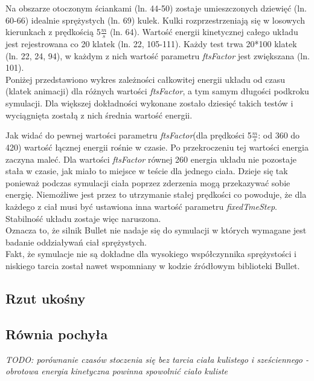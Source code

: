 
  
Na obszarze otoczonym ściankami (ln. 44-50) zostaje umieszczonych dziewięć (ln.
60-66) idealnie sprężystych (ln. 69) kulek. Kulki rozprzestrzeniają się w
losowych kierunkach z prędkością 5$ \frac{m}{s} $ (ln. 64). Wartość energii
kinetycznej całego układu jest rejestrowana co 20 klatek (ln. 22, 105-111).
Każdy test trwa 20*100 klatek (ln. 22, 24, 94), w każdym z nich wartość
parametru \emph{ftsFactor} jest zwiększana (ln. 101).\\
Poniżej przedstawiono wykres zależności całkowitej energii układu od
czasu (klatek animacji) dla różnych wartości \emph{ftsFactor}, a tym samym
długości podkroku symulacji. Dla większej dokładności wykonane zostało dziesięć
takich testów i wyciągnięta zostałą z nich średnia wartość energii.



Jak widać do pewnej wartości parametru \emph{ftsFactor}(dla prędkości 5$
\frac{m}{s} $: od 360 do 420) wartość łącznej energii rośnie w czasie. Po
przekroczeniu tej wartości energia zaczyna maleć. Dla wartości \emph{ftsFactor}
równej 260 energia układu nie pozostaje stała w czasie, jak miało to miejsce w
teście dla jednego ciała. Dzieje się tak ponieważ podczas symulacji ciała
poprzez zderzenia mogą przekazywać sobie energię. Niemożliwe jest przez to
utrzymanie stałej prędkości co powoduje, że dla każdego z ciał musi być
ustawiona inna wartość parametru \emph{fixedTmeStep}. Stabilność układu zostaje
więc naruszona.\\
Oznacza to, że silnik Bullet nie nadaje się do symulacji w których wymagane jest
badanie oddziaływań ciał sprężystych.\\
Fakt, że symulacje nie są dokładne dla wysokiego współczynnika sprężystości i
niskiego tarcia został nawet wspomniany w kodzie źródłowym biblioteki Bullet.



\subsection{Rzut ukośny}

\subsection{Równia pochyła}
\emph{TODO: porównanie czasów stoczenia się bez tarcia ciała kulistego i
sześciennego - obrotowa energia kinetyczna powinna spowolnić ciało kuliste}

